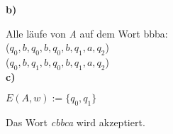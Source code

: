 \documentclass[a4paper,graphics,11pt]{article}
\begin{document}
\textbf{b)}

Alle läufe von \textit{A} auf dem Wort bbba:\\
($q_0,b,q_0,b,q_0,b,q_1,a,q_2$)\\
($q_0,b,q_1,b,q_0,b,q_1,a,q_2$)\\

\textbf{c)}

$E(A,w):=\{q_0,q_1\}$

Das Wort \textit{cbbca} wird akzeptiert.\\
\end{document}
